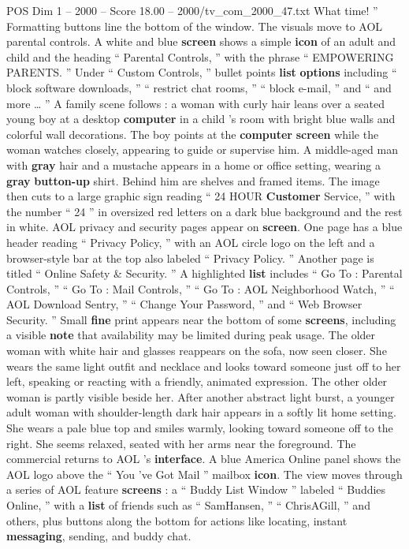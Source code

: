 \begin{textsample}{POS Dim 1 – 2000 – Score 18.00 – 2000/tv\_com\_2000\_47.txt}
What time! ” Formatting buttons line the bottom of the window.
The visuals move to AOL parental controls.
A white and blue \textbf{screen} shows a simple \textbf{icon} of an adult and child and the heading “ Parental Controls, ” with the phrase “ EMPOWERING PARENTS. ” Under “ Custom Controls, ” bullet points \textbf{list} \textbf{options} including “ block software downloads, ” “ restrict chat rooms, ” “ block e-mail, ” and “ and more … ” A family scene follows : a woman with curly hair leans over a seated young boy at a desktop \textbf{computer} in a child ’s room with bright blue walls and colorful wall decorations.
The boy points at the \textbf{computer} \textbf{screen} while the woman watches closely, appearing to guide or supervise him.
A middle-aged man with \textbf{gray} hair and a mustache appears in a home or office setting, wearing a \textbf{gray} \textbf{button-up} shirt.
Behind him are shelves and framed items.
The image then cuts to a large graphic sign reading “ 24 HOUR \textbf{Customer} Service, ” with the number “ 24 ” in oversized red letters on a dark blue background and the rest in white.
AOL privacy and security pages appear on \textbf{screen}.
One page has a blue header reading “ Privacy Policy, ” with an AOL circle logo on the left and a browser-style bar at the top also labeled “ Privacy Policy. ” Another page is titled “ Online Safety \& Security. ” A highlighted \textbf{list} includes “ Go To : Parental Controls, ” “ Go To : Mail Controls, ” “ Go To : AOL Neighborhood Watch, ” “ AOL Download Sentry, ” “ Change Your Password, ” and “ Web Browser Security. ” Small \textbf{fine} print appears near the bottom of some \textbf{screens}, including a visible \textbf{note} that availability may be limited during peak usage.
The older woman with white hair and glasses reappears on the sofa, now seen closer.
She wears the same light outfit and necklace and looks toward someone just off to her left, speaking or reacting with a friendly, animated expression.
The other older woman is partly visible beside her.
After another abstract light burst, a younger adult woman with shoulder-length dark hair appears in a softly lit home setting.
She wears a pale blue top and smiles warmly, looking toward someone off to the right.
She seems relaxed, seated with her arms near the foreground.
The commercial returns to AOL ’s \textbf{interface}.
A blue America Online panel shows the AOL logo above the “ You ’ve Got Mail ” mailbox \textbf{icon}.
The view moves through a series of AOL feature \textbf{screens} : a “ Buddy List Window ” labeled “ Buddies Online, ” with a \textbf{list} of friends such as “ SamHansen, ” “ ChrisAGill, ” and others, plus buttons along the bottom for actions like locating, instant \textbf{messaging}, sending, and buddy chat.

\end{textsample}
